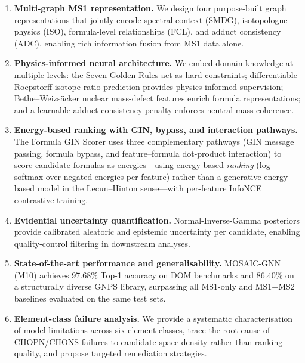 \documentclass[journal=jcisd8]{achemso}
\begin{document}
\begin{enumerate}[leftmargin=1.5em, label=\arabic*.]
  \item \textbf{Multi-graph MS1 representation.}
    We design four purpose-built graph representations that jointly encode spectral context
    (SMDG), isotopologue physics (ISO), formula-level relationships (FCL), and adduct
    consistency (ADC), enabling rich information fusion from MS1 data alone.

  \item \textbf{Physics-informed neural architecture.}
    We embed domain knowledge at multiple levels: the Seven Golden Rules act as hard
    constraints; differentiable Roepstorff isotope ratio prediction provides physics-informed
    supervision; Bethe--Weizs{\"a}cker nuclear mass-defect features enrich formula representations;
    and a learnable adduct consistency penalty enforces neutral-mass coherence.

  \item \textbf{Energy-based ranking with GIN, bypass, and interaction pathways.}
    The Formula GIN Scorer uses three complementary pathways (GIN message passing,
    formula bypass, and feature--formula dot-product interaction) to score candidate
    formulas as energies---using energy-based \emph{ranking} (log-softmax over
    negated energies per feature) rather than a generative energy-based model in
    the Lecun--Hinton sense---with per-feature InfoNCE contrastive training.

  \item \textbf{Evidential uncertainty quantification.}
    Normal-Inverse-Gamma posteriors provide calibrated aleatoric and epistemic uncertainty
    per candidate, enabling quality-control filtering in downstream analyses.

  \item \textbf{State-of-the-art performance and generalisability.}
    MOSAIC-GNN (M10) achieves 97.68\% Top-1 accuracy on DOM benchmarks and 86.40\% on a
    structurally diverse GNPS library, surpassing all MS1-only and MS1+MS2 baselines
    evaluated on the same test sets.

  \item \textbf{Element-class failure analysis.}
    We provide a systematic characterisation of model limitations across six element
    classes, trace the root cause of CHOPN/CHONS failures to candidate-space density
    rather than ranking quality, and propose targeted remediation strategies.
\end{enumerate}
\end{document}
